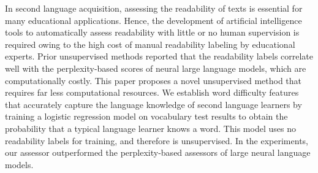 In second language acquisition, assessing the readability of texts is essential for many educational applications. Hence, the development of artificial intelligence tools to automatically assess readability with little or no human supervision is required owing to the high cost of manual readability labeling by educational experts. Prior unsupervised methods reported that the readability labels correlate well with the perplexity-based scores of neural large language models, which are computationally costly. This paper proposes a novel unsupervised method that requires far less computational resources. We establish word difficulty features that accurately capture the language knowledge of second language learners by training a logistic regression model on vocabulary test results to obtain the probability that a typical language learner knows a word. This model uses no readability labels for training, and therefore is unsupervised. In the experiments, our assessor outperformed the perplexity-based assessors of large neural language models.
